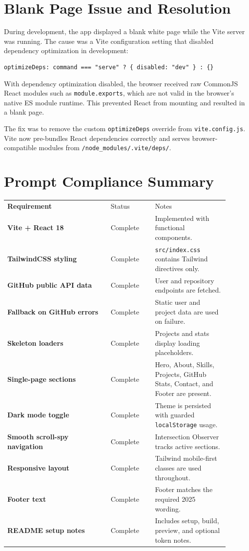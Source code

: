 \documentclass[12pt,a4paper]{article}
\newcommand{\code}[1]{\colorbox{CodeBg}{\texttt{#1}}}
\begin{document}
\section{Blank Page Issue and Resolution}

During development, the app displayed a blank white page while the Vite server
was running. The cause was a Vite configuration setting that disabled
dependency optimization in development:

\begin{verbatim}
optimizeDeps: command === "serve" ? { disabled: "dev" } : {}
\end{verbatim}

With dependency optimization disabled, the browser received raw CommonJS React
modules such as \code{module.exports}, which are not valid in the browser's
native ES module runtime. This prevented React from mounting and resulted in a
blank page.

The fix was to remove the custom \code{optimizeDeps} override from
\code{vite.config.js}. Vite now pre-bundles React dependencies correctly and
serves browser-compatible modules from \code{/node\_modules/.vite/deps/}.

\section{Prompt Compliance Summary}

\begin{longtable}{>{\bfseries}p{0.42\linewidth}p{0.18\linewidth}p{0.30\linewidth}}
Requirement & Status & Notes \\
Vite + React 18 & Complete & Implemented with functional components. \\
TailwindCSS styling & Complete & \code{src/index.css} contains Tailwind directives only. \\
GitHub public API data & Complete & User and repository endpoints are fetched. \\
Fallback on GitHub errors & Complete & Static user and project data are used on failure. \\
Skeleton loaders & Complete & Projects and stats display loading placeholders. \\
Single-page sections & Complete & Hero, About, Skills, Projects, GitHub Stats, Contact, and Footer are present. \\
Dark mode toggle & Complete & Theme is persisted with guarded \code{localStorage} usage. \\
Smooth scroll-spy navigation & Complete & Intersection Observer tracks active sections. \\
Responsive layout & Complete & Tailwind mobile-first classes are used throughout. \\
Footer text & Complete & Footer matches the required 2025 wording. \\
README setup notes & Complete & Includes setup, build, preview, and optional token notes. \\
\end{longtable}
\end{document}
